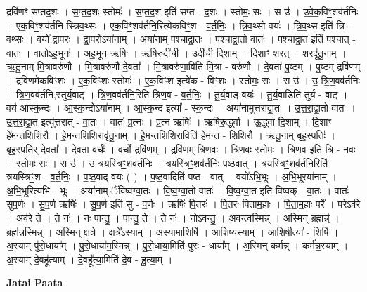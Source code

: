 \documentclass[17pt]{extarticle}
\begin{document}
द्रवि॑णꣳ सप्तद॒शः । स॒प्त॒द॒शः स्तोमः॑ । स॒प्त॒द॒श इति॑ सप्त - द॒शः । स्तोमः॒ सः । स उ॑ । 
उ॒वे॒क॒विꣳ॒॒शव॑र्तनिः । ए॒क॒विꣳ॒॒शव॑र्तनि स्त्रिव॒थ्सः । ए॒क॒विꣳ॒॒शव॑र्तनि॒रित्ये॑कविꣳ॒॒श - व॒र्त॒निः॒ । त्रि॒व॒थ्सो वयः॑ । त्रि॒व॒थ्स इति॑ त्रि - व॒थ्सः । वयो᳚ द्वाप॒रः । द्वा॒प॒रोऽया॑नाम् । अया॑नाम् पश्चाद्वा॒तः । प॒श्चा॒द्वा॒तो वातः॑ । प॒श्चा॒द्वा॒त इति॑ पश्चात् - वा॒तः । वातो॑ऽह॒भूनः॑ । अ॒ह॒भून॒ ऋषिः॑ । ऋषि॒रुदी॑ची । उदी॑ची दि॒शाम् । दि॒शाꣳ श॒रत् । श॒रदृ॑तू॒नाम् । ऋ॒तू॒नाम् मि॒त्रावरु॑णौ । मि॒त्रावरु॑णौ दे॒वता᳚ । मि॒त्रावरु॑णा॒विति॑ मि॒त्रा - वरु॑णौ । दे॒वता॑ पु॒ष्टम् । पु॒ष्टम् द्रवि॑णम् । द्रवि॑णमेकविꣳ॒॒शः । ए॒क॒विꣳ॒॒शः स्तोमः॑ । ए॒क॒विꣳ॒॒श इत्ये॑क - विꣳ॒॒शः । स्तोमः॒ सः । स उ॑ । उ॒ त्रि॒ण॒वव॑र्तनिः । त्रि॒ण॒वव॑र्तनि,स्तुर्य॒वाट् । त्रि॒ण॒वव॑र्तनि॒रिति॑ त्रिण॒व - व॒र्त॒निः॒ । तु॒र्य॒वाड् वयः॑ । तु॒र्य॒वाडिति॑ तुर्य - वाट् । वय॑ आस्क॒न्दः । आ॒स्क॒न्दोऽया॑नाम् । आ॒स्क॒न्द इत्या᳚ - स्क॒न्दः । अया॑नामुत्तराद्वा॒तः । उ॒त्त॒रा॒द्वा॒तो वातः॑ । उ॒त्त॒रा॒द्वा॒त इत्यु॑त्तरात् - वा॒तः । वातः॑ प्र॒त्नः । प्र॒त्न ऋषिः॑ । ऋषि॑रू॒र्द्ध्वा । ऊ॒र्द्ध्वा दि॒शाम् । दि॒शाꣳ हे॑मन्तशिशि॒रौ । हे॒म॒न्त॒शि॒शि॒रावृ॑तू॒नाम् । हे॒म॒न्त॒शि॒शि॒राविति॑ हेमन्त - शि॒शि॒रौ । ऋ॒तू॒नाम् बृह॒स्पतिः॑ । बृह॒स्पति॑र् दे॒वता᳚ । दे॒वता॒ वर्चः॑ । वर्चो॒ द्रवि॑णम् । द्रवि॑णम् त्रिण॒वः । त्रि॒ण॒वः स्तोमः॑ । त्रि॒ण॒व इति॑ त्रि - न॒वः । स्तोमः॒ सः । स उ॑ । उ॒ त्र॒य॒स्त्रिꣳ॒॒शव॑र्तनिः । त्र॒य॒स्त्रिꣳ॒॒शव॑र्तनिः पष्ठ॒वात् । त्र॒य॒स्त्रिꣳ॒॒शव॑र्तनि॒रिति॑ त्रयस्त्रिꣳ॒॒श - व॒र्त॒निः॒ । प॒ष्ठ॒वाद् वयः॑ ( ) । प॒ष्ठ॒वादिति॑ पष्ठ - वात् । वयो॑ऽभि॒भूः । अ॒भि॒भूरया॑नाम् । अ॒भि॒भूरित्य॑भि - भूः । अया॑नाम् ॅविष्वग्वा॒तः । वि॒ष्व॒ग्वा॒तो वातः॑ । वि॒ष्व॒ग्वा॒त इति॑ विष्वक् - वा॒तः । वातः॑ सुप॒र्णः । सु॒प॒र्ण ऋषिः॑ । सु॒प॒र्ण इति॑ सु - प॒र्णः । ऋषिः॑ पि॒तरः॑ । पि॒तरः॑ पिताम॒हाः । पि॒ता॒म॒हाः परे᳚ । परेऽव॑रे । अव॑रे॒ ते । ते नः॑ । नः॒ पा॒न्तु॒ । पा॒न्तु॒ ते । ते नः॑ । नो॒ऽव॒न्तु॒ । अ॒व॒न्त्व॒स्मिन्न् । अ॒स्मिन् ब्रह्मन्न्॑ । ब्रह्म॑न्न॒स्मिन्न् । अ॒स्मिन् क्ष॒त्रे । क्ष॒त्रे᳚ऽस्याम् । अ॒स्यामा॒शिषि॑ । आ॒शिष्य॒स्याम् । आ॒शिषीत्या᳚ - शिषि॑ । अ॒स्याम् पु॑रो॒धाया᳚म् । पु॒रो॒धाया॑म॒स्मिन्न् । पु॒रो॒धाया॒मिति॑ पुरः - धाया᳚म् । अ॒स्मिन् कर्मन्न्॑ । कर्म॑न्न॒स्याम् । अ॒स्याम् दे॒वहू᳚त्याम् । दे॒वहू᳚त्या॒मिति॑ दे॒व - हू॒त्या॒म् । \newline

\textbf{Jatai Paata} \newline
\end{document}
